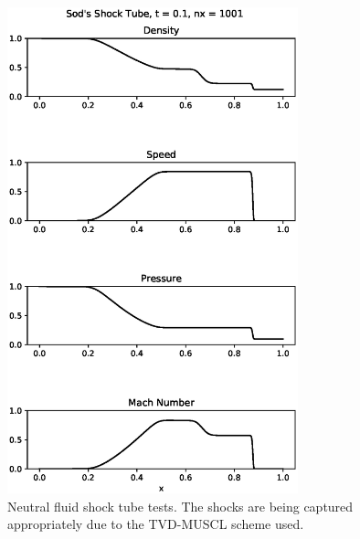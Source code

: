 \documentclass[12pt,upcase]{umlthesis}
\begin{document}
\begin{figure}[ht!]
	\includegraphics[width=0.75\textwidth]{images/shocktube.eps}
	\caption{Neutral fluid shock tube tests. The shocks are being captured appropriately due to the TVD-MUSCL scheme used.}\label{fig:shocktube}
\end{figure}
\end{document}
